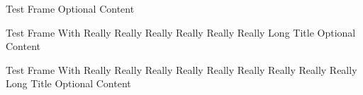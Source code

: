 \documentclass[10pt,dvipsnames]{beamer}
\begin{document}
\begin{frame}{Test Frame}
    Optional Content
\end{frame}

\begin{frame}{Test Frame With Really Really Really Really Really Really Long Title}
    Optional Content
\end{frame}

\begin{frame}{Test Frame With Really Really Really Really Really Really Really Really Really Long Title}
    Optional Content
\end{frame}
\end{document}
